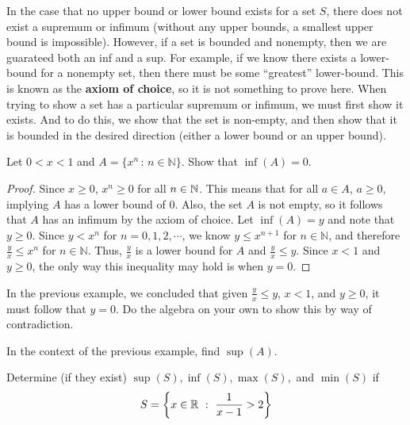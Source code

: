 \clearpage


In the case that no upper bound or lower bound exists for a set $S$, there does not exist a supremum or infimum (without any upper bounds, a smallest upper bound is impossible). However, if a set is bounded and nonempty, then we are guarateed both an inf and a sup. For example, if we know there exists a lower-bound for a nonempty set, then there must be some ``greatest'' lower-bound. This is known as the \textbf{axiom of choice}, so it is not something to prove here. When trying to show a set has a particular supremum or infimum, we must first show it exists. And to do this, we show that the set is non-empty, and then show that it is bounded in the desired direction (either a lower bound or an upper bound). \\

\begin{example}
    Let $0<x<1$ and $A=\{x^n\, :\, n\in\mathbb{N}\}$. Show that $\inf(A)=0$.\\

    \begin{proof}
        Since $x\geq 0$, $x^n\geq 0$ for all $n\in\mathbb{N}$. This means that for all $a\in A$, $a\geq 0$, implying $A$ has a lower bound of 0. Also, the set $A$ is not empty, so it follows that $A$ has an infimum by the axiom of choice. Let $\inf(A)=y$ and note that $y\geq 0$. Since $y<x^n$ for $n=0,1,2,\cdots$, we know $y\leq x^{n+1}$ for $n\in\mathbb{N}$, and therefore $\frac{y}{x}\leq x^n$ for $n\in\mathbb{N}$. Thus, $\frac{y}{x}$ is a lower bound for $A$ and $\frac{y}{x}\leq y$. Since $x<1$ and $y\geq 0$, the only way this inequality may hold is when $y=0$.
    \end{proof}
\end{example}

\begin{exercise}
    In the previous example, we concluded that given $\frac{y}{x}\leq y$, $x<1$, and $y\geq 0$, it must follow that $y=0$. Do the algebra on your own to show this by way of contradiction.
\end{exercise}
    \vspace{-3mm}
\begin{exercise}
    In the context of the previous example, find $\sup(A)$. 
\end{exercise}
    \vspace{-3mm}
\begin{exercise}
    Determine (if they exist)  $\sup(S),\inf(S),\max(S),$ and $\min(S)$ if \[S=\left\{x\in\R\ : \ \frac{1}{x-1}>2\right\}\]
\end{exercise}

